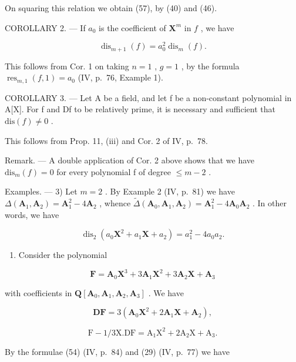 On squaring this relation we obtain (57), by (40) and (46).

COROLLARY 2. --- If \(a_{0}\) is the coefficient of \(\mathbf{X}^{m}\) in \(f\) , we have

\[
\operatorname{dis} _ {m + 1} (f) = a _ {0} ^ {2} \operatorname{dis} _ {m} (f).\tag{58}
\]

This follows from Cor. 1 on taking \(n = 1\) , \(g = 1\) , by the formula \(\operatorname{res}_{m,1}(f,1) = a_0\) (IV, p.~76, Example 1).

COROLLARY 3. --- Let A be a field, and let f be a non-constant polynomial in A{[}X{]}. For f and Df to be relatively prime, it is necessary and sufficient that \(\text{dis}(f) \neq 0\) .

This follows from Prop. 11, (iii) and Cor. 2 of IV, p.~78.

Remark. --- A double application of Cor. 2 above shows that we have \(\mathrm{dis}_{m}(f)=0\) for every polynomial f of degree \(\leqslant m-2\) .

Examples. --- 3) Let \(m = 2\) . By Example 2 (IV, p.~81) we have \(\Delta(\mathbf{A}_1, \mathbf{A}_2) = \mathbf{A}_1^2 - 4\mathbf{A}_2\) , whence \(\tilde{\Delta}(\mathbf{A}_0, \mathbf{A}_1, \mathbf{A}_2) = \mathbf{A}_1^2 - 4\mathbf{A}_0\mathbf{A}_2\) . In other words, we have

\[
\operatorname{dis} _ {2} \left(a _ {0} \mathbf {X} ^ {2} + a _ {1} \mathbf {X} + a _ {2}\right) = a _ {1} ^ {2} - 4 a _ {0} a _ {2}.
\]

\begin{enumerate}
\def\labelenumi{\arabic{enumi})}
\setcounter{enumi}{3}
\tightlist
\item
  Consider the polynomial
\end{enumerate}

\[
\mathbf {F} = \mathbf {A} _ {0} \mathbf {X} ^ {3} + 3 \mathbf {A} _ {1} \mathbf {X} ^ {2} + 3 \mathbf {A} _ {2} \mathbf {X} + \mathbf {A} _ {3}
\]

with coefficients in \(\mathbf{Q}[\mathbf{A}_0,\mathbf{A}_1,\mathbf{A}_2,\mathbf{A}_3]\) . We have

\[
\mathbf {D F} = 3 \left(\mathbf {A} _ {0} \mathbf {X} ^ {2} + 2 \mathbf {A} _ {1} \mathbf {X} + \mathbf {A} _ {2}\right),
\]

\[
\mathrm{F} - 1 / 3 \mathrm{X}. \mathrm{DF} = \mathrm{A} _ {1} \mathrm{X} ^ {2} + 2 \mathrm{A} _ {2} \mathrm{X} + \mathrm{A} _ {3}.
\]

By the formulae (54) (IV, p.~84) and (29) (IV, p.~77) we have

